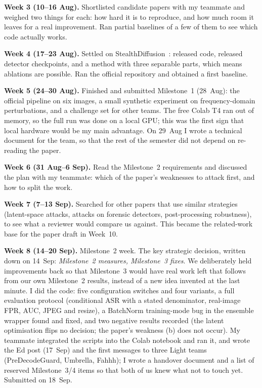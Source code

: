 \documentclass[journal]{IEEEtran}
\begin{document}
\textbf{Week 3 (10--16 Aug).} Shortlisted candidate papers with my teammate and weighed two things for each: how hard it is to reproduce, and how much room it leaves for a real improvement. Ran partial baselines of a few of them to see which code actually works.

\textbf{Week 4 (17--23 Aug).} Settled on StealthDiffusion~\cite{zhou2024stealthdiffusion}: released code, released detector checkpoints, and a method with three separable parts, which means ablations are possible. Ran the official repository and obtained a first baseline.

\textbf{Week 5 (24--30 Aug).} Finished and submitted Milestone~1 (28~Aug): the official pipeline on six images, a small synthetic experiment on frequency-domain perturbations, and a challenge set for other teams. The free Colab T4 ran out of memory, so the full run was done on a local GPU; this was the first sign that local hardware would be my main advantage. On 29~Aug I wrote a technical document for the team, so that the rest of the semester did not depend on re-reading the paper.

\textbf{Week 6 (31 Aug--6 Sep).} Read the Milestone~2 requirements and discussed the plan with my teammate: which of the paper's weaknesses to attack first, and how to split the work.

\textbf{Week 7 (7--13 Sep).} Searched for other papers that use similar strategies (latent-space attacks, attacks on forensic detectors, post-processing robustness), to see what a reviewer would compare us against. This became the related-work base for the paper draft in Week~10.

\textbf{Week 8 (14--20 Sep).} Milestone~2 week. The key strategic decision, written down on 14~Sep: \emph{Milestone~2 measures, Milestone~3 fixes}. We deliberately held improvements back so that Milestone~3 would have real work left that follows from our own Milestone~2 results, instead of a new idea invented at the last minute. I did the code: five configuration switches and four variants, a full evaluation protocol (conditional ASR with a stated denominator, real-image FPR, AUC, JPEG and resize), a BatchNorm training-mode bug in the ensemble wrapper found and fixed, and two negative results recorded (the latent optimisation flips no decision; the paper's weakness (b) does not occur). My teammate integrated the scripts into the Colab notebook and ran it, and wrote the Ed post (17~Sep) and the first messages to three Light teams (PreDecodeGuard, Umbrella, Fahhh); I wrote a handover document and a list of reserved Milestone~3/4 items so that both of us knew what not to touch yet. Submitted on 18~Sep.
\end{document}
